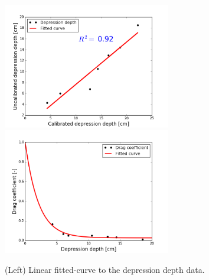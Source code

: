 \documentclass[review,11pt]{elsarticle}
\begin{document}
\begin{figure}[!h]
\centering
\includegraphics[width=6.cm, height=5.5cm]{./figures/fittedcurve-dd.png}
\includegraphics[width=6.cm, height=5.5cm]{./figures/fittedcurve-manning.png}
\caption{ (Left) Linear fitted-curve to the depression depth data. }
\label{curvefit-dd-manning}
\end{figure}
\end{document}
